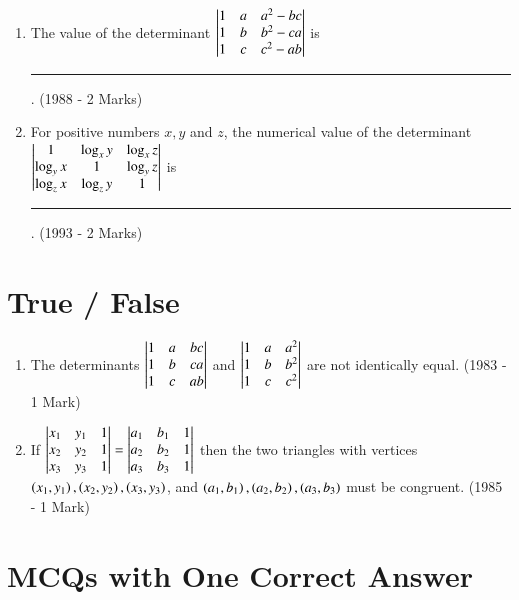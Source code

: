 \documentclass[journal]{IEEEtran}
\begin{document}
\begin{enumerate}
	\item The value of the determinant $\begin{vmatrix}
			1 & a & a^2 - bc \\
			1 & b & b^2 - ca \\
			1 & c & c^2 - ab
		\end{vmatrix}$ is \rule{1cm}{0.2pt}.	
		\hfill (1988 - 2 Marks)

	\item For positive numbers $x, y$ and $z$, the numerical value of the determinant
		$\begin{vmatrix}
			1 & \log_x{y} & \log_x{z} \\
			\log_y{x} & 1 & \log_y{z} \\
			\log_z{x} & \log_z{y} & 1 \\
		\end{vmatrix}$ is \rule{1cm}{0.2pt}.
		\hfill (1993 - 2 Marks)
\end{enumerate}

\section{True / False}

\begin{enumerate}
	\item The determinants $\begin{vmatrix}
			1 & a & bc \\
			1 & b & ca \\
			1 & c & ab
		\end{vmatrix}$ and $\begin{vmatrix}
			1 & a & a^2 \\
			1 & b & b^2 \\
			1 & c & c^2
		\end{vmatrix}$ are not identically equal.
		\hfill (1983 - 1 Mark)
	
	\item If $\begin{vmatrix}
			x_1 & y_1 & 1 \\
			x_2 & y_2 & 1 \\
			x_3 & y_3 & 1
		\end{vmatrix} = \begin{vmatrix}
			a_1 & b_1 & 1 \\
			a_2 & b_2 & 1 \\
			a_3 & b_3 & 1
		\end{vmatrix}$ then the two triangles with vertices	
		$\left(x_1, y_1\right), \left(x_2, y_2\right), \left(x_3, y_3\right)$,
		and $\left(a_1, b_1\right), \left(a_2, b_2\right), \left(a_3, b_3\right)$
		must be congruent.
		\hfill (1985 - 1 Mark)
\end{enumerate}

\section{MCQs with One Correct Answer}
\end{document}
